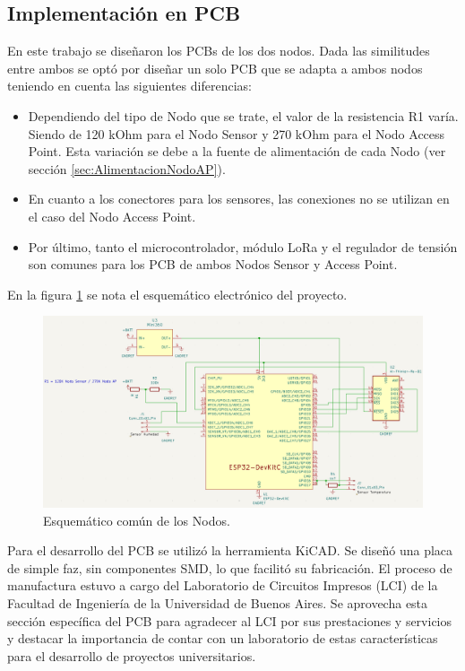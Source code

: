 \subsection{Implementación en PCB}
\label{sec:PCB}

En este trabajo se diseñaron los PCBs de los dos nodos. Dada las similitudes entre ambos se optó por diseñar un solo PCB que se adapta a ambos nodos teniendo en cuenta las siguientes diferencias:
\begin{itemize}
    \item Dependiendo del tipo de Nodo que se trate, el valor de la resistencia R1 varía. Siendo de 120 kOhm para el Nodo Sensor y 270 kOhm para el Nodo Access Point.
Esta variación se debe a la fuente de alimentación de cada Nodo (ver sección \ref{sec:AlimentacionNodoAP}).
\item En cuanto a los conectores para los sensores, las conexiones no se utilizan en el caso del Nodo Access Point.
\item Por último, tanto el microcontrolador, módulo LoRa y el regulador de tensión son comunes para los PCB de ambos Nodos Sensor y Access Point.
\end{itemize}

En la figura \ref{fig:esquematico} se nota el esquemático electrónico del proyecto.
\label{sec:EsquematicoGral}
\begin{figure}[H]
	\centering
	\includegraphics[scale=0.5]{./Figures/Esquematicos/esquematico.png}
	\caption{Esquemático común de los Nodos.}
	\label{fig:esquematico}
\end{figure}



Para el desarrollo del PCB se utilizó la herramienta KiCAD. Se diseñó una placa de simple faz, sin componentes SMD, lo que facilitó su fabricación. El proceso de manufactura estuvo a cargo del Laboratorio de Circuitos Impresos (LCI) de la Facultad de Ingeniería de la Universidad de Buenos Aires.
Se aprovecha esta sección específica del PCB para agradecer al LCI por sus prestaciones y servicios y destacar la importancia de contar con un laboratorio de estas características para el desarrollo de proyectos universitarios.

